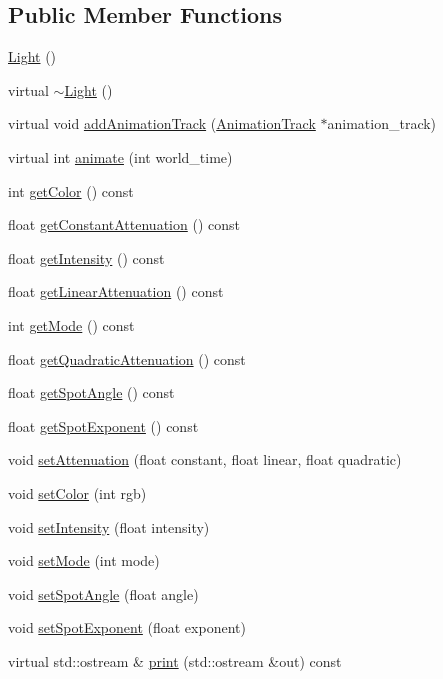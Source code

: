 \subsection*{Public Member Functions}
\begin{CompactItemize}
\item 
\hyperlink{classm3g_1_1Light_7f8a7be05225f470c200f7e4ff914a3c}{Light} ()
\item 
virtual \hyperlink{classm3g_1_1Light_f50d3d8cdb323e1a9fbd7bfac3aeba06}{$\sim$Light} ()
\item 
virtual void \hyperlink{classm3g_1_1Light_415c0b110f95410ded9b85e5d99a496b}{addAnimationTrack} (\hyperlink{classm3g_1_1AnimationTrack}{AnimationTrack} $\ast$animation\_\-track)
\item 
virtual int \hyperlink{classm3g_1_1Light_8aad1ceab4c2a03609c8a42324ce484d}{animate} (int world\_\-time)
\item 
int \hyperlink{classm3g_1_1Light_4cfa1931c265ec3412fe3f6408a1b4f5}{getColor} () const 
\item 
float \hyperlink{classm3g_1_1Light_9553ab96cb7639acafcebb81888af687}{getConstantAttenuation} () const 
\item 
float \hyperlink{classm3g_1_1Light_ca846da41d09a6ae01d6b362c33e938d}{getIntensity} () const 
\item 
float \hyperlink{classm3g_1_1Light_50e949b0cc2014e576987379cac07769}{getLinearAttenuation} () const 
\item 
int \hyperlink{classm3g_1_1Light_d4ce4524e4751fe5e3cfb8c270347d54}{getMode} () const 
\item 
float \hyperlink{classm3g_1_1Light_9ec7130ca1977cfeb4b2cbebc31971b4}{getQuadraticAttenuation} () const 
\item 
float \hyperlink{classm3g_1_1Light_1117f914d754fe74c090dc97bde905eb}{getSpotAngle} () const 
\item 
float \hyperlink{classm3g_1_1Light_a359fee191741efb7e576616a59a76f7}{getSpotExponent} () const 
\item 
void \hyperlink{classm3g_1_1Light_391c5cff137fc2e810f5129a5381196f}{setAttenuation} (float constant, float linear, float quadratic)
\item 
void \hyperlink{classm3g_1_1Light_b1f5cc0f5cc6bbbd716a526c61f1081d}{setColor} (int rgb)
\item 
void \hyperlink{classm3g_1_1Light_ce02325cb6289c007d569c193641c468}{setIntensity} (float intensity)
\item 
void \hyperlink{classm3g_1_1Light_9f407b18ba6235cb96fa95611c1ea3a4}{setMode} (int mode)
\item 
void \hyperlink{classm3g_1_1Light_30ce206b37f6ed5e918fbc75b3f91072}{setSpotAngle} (float angle)
\item 
void \hyperlink{classm3g_1_1Light_787eb66801e17d0412559598326ce19d}{setSpotExponent} (float exponent)
\item 
virtual std::ostream \& \hyperlink{classm3g_1_1Light_6fea17fa1532df3794f8cb39cb4f911f}{print} (std::ostream \&out) const 
\end{CompactItemize}
